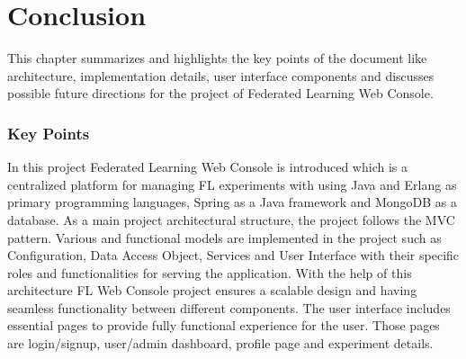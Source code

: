 \chapter{Conclusion}


This chapter summarizes and highlights the key points of the document like architecture, implementation details, user interface components and
discusses possible future directions for the project of Federated Learning Web Console.


\subsection{Key Points}
In this project Federated Learning Web Console is introduced which is a centralized platform for managing FL experiments with using Java and Erlang as primary programming languages,
Spring as a Java framework and MongoDB as a database. As a main project architectural structure, the project follows the MVC pattern. Various and functional models are implemented in
the project such as Configuration, Data Access Object, Services and User Interface with their specific roles and functionalities for serving the application. With the help of this
architecture FL Web Console project ensures a scalable design and having seamless functionality between different components. The user interface includes essential pages to provide
fully functional experience for the user. Those pages are login/signup, user/admin dashboard, profile page and experiment details.


